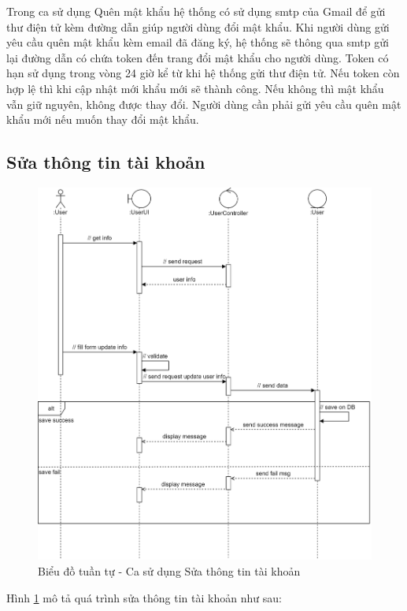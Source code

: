 \documentclass[./../main.tex]{subfiles}
\begin{document}
Trong ca sử dụng Quên mật khẩu hệ thống có sử dụng \acrshort{smtp} của Gmail để gửi thư điện tử kèm đường dẫn giúp người dùng đổi mật khẩu. Khi người dùng gửi yêu cầu quên mật khẩu kèm email đã đăng ký, hệ thống sẽ thông qua \acrshort{smtp} gửi lại đường dẫn có chứa token đến trang đổi mật khẩu cho người dùng. Token có hạn sử dụng trong vòng 24 giờ kể từ khi hệ thống gửi thư điện tử. Nếu token còn hợp lệ thì khi cập nhật mới khẩu mới sẽ thành công. Nếu không thì mật khẩu vẫn giữ nguyên, không được thay đổi. Người dùng cần phải gửi yêu cầu quên mật khẩu mới nếu muốn thay đổi mật khẩu.

\subsection{Sửa thông tin tài khoản}
\begin{figure}[H]
	\centering
	\includegraphics[width=\linewidth]{./img/uc4.png}
	\caption{\label{tab:seq-uc4}Biểu đồ tuần tự - Ca sử dụng Sửa thông tin tài khoản}
\end{figure}
Hình \ref{tab:seq-uc4} mô tả quá trình sửa thông tin tài khoản như sau:
\end{document}
